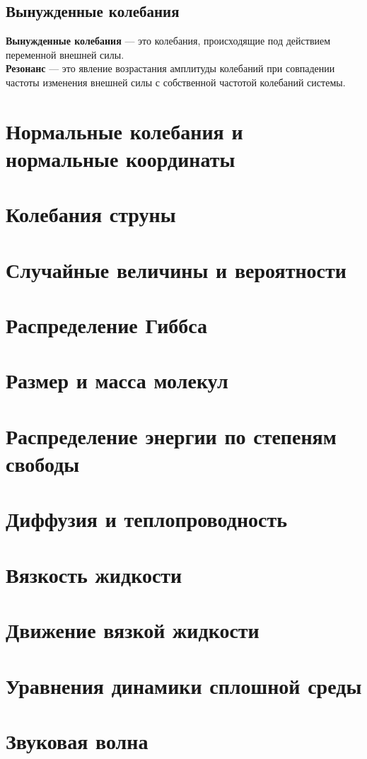 \documentclass[fleqn,a4paper,12pt,titlepage,finall]{article}
\begin{document}
\subsection{Вынужденные колебания}
{\bf Вынужденные колебания} --- это колебания, происходящие под действием
переменной внешней силы. \\
{\bf Резонанс} --- это явление возрастания амплитуды колебаний при совпадении
частоты изменения внешней силы с собственной частотой колебаний системы. \\

\section{Нормальные колебания и нормальные координаты}
\section{Колебания струны}
\section{Случайные величины и вероятности}
\section{Распределение Гиббса}
\section{Размер и масса молекул}
\section{Распределение энергии по степеням свободы}
\section{Диффузия и теплопроводность}
\section{Вязкость жидкости}
\section{Движение вязкой жидкости}
\section{Уравнения динамики сплошной среды}
\section{Звуковая волна}
\end{document}
